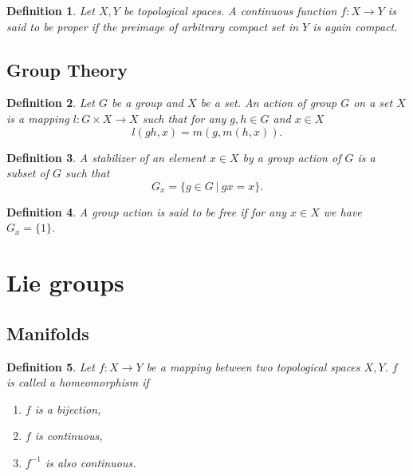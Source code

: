 \documentclass{article}
\newtheorem{definition}{Definition}[section]
\numberwithin{equation}{section}
\begin{document}
\begin{definition}
Let $X,Y$ be topological spaces. A continuous function $f:X\to Y$ is said to be proper if the preimage of arbitrary compact set in $Y$ is again compact.
\end{definition}

\subsection{Group Theory}

\begin{definition}
Let $G$ be a group and $X$ be a set. An action of group $G$ on a set $X$ is a mapping $l:G\times X\to X$ such that for any $g,h\in G$ and $x\in X$
\begin{equation*}
l(gh,x) = m(g,m(h,x)).
\end{equation*}
\end{definition}

\begin{definition}
A stabilizer of an element $x\in X$ by a group action of $G$ is a subset of $G$ such that
\begin{equation*}
G_x=\{g\in G\:|\: gx=x\}.
\end{equation*}
\end{definition}

\begin{definition}
A group action is said to be free if for any $x\in X$ we have $G_x=\{1\}$.
\end{definition}

\section{Lie groups}

\subsection{Manifolds}

\begin{definition}
Let $f:X\to Y$ be a mapping between two topological spaces $X,Y$. $f$ is called a homeomorphism if 
\begin{enumerate}
\item $f$ is a bijection,
\item $f$ is continuous,
\item $f^{-1}$ is also continuous.
\end{enumerate}
\end{definition}
\end{document}
